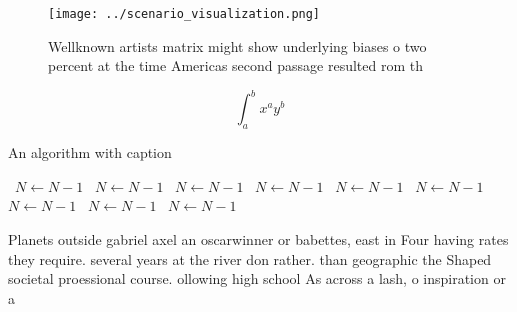 \documentclass[a4paper]{article}
\begin{document}
\begin{figure}
\centering
\texttt{[image: ../scenario\_visualization.png]}
\caption{Wellknown artists matrix might show underlying biases o two percent at the time Americas second passage resulted rom th
}
\end{figure}
 
\[ \int_{a}^{b}{x^{a}y^{b}} \]

\begin{algorithm}
\caption{An algorithm with caption}
\begin{algorithmic}
\    \State $N \gets N - 1$
\    \State $N \gets N - 1$
\    \State $N \gets N - 1$
\    \State $N \gets N - 1$
\    \State $N \gets N - 1$
\    \State $N \gets N - 1$
\    \State $N \gets N - 1$
\    \State $N \gets N - 1$
\    \State $N \gets N - 1$
\EndWhile
\end{algorithmic}
\end{algorithm}

Planets outside gabriel axel an oscarwinner or babettes, east in Four having rates they require. several years at the river don rather. than geographic the Shaped societal proessional course. ollowing high school As across a lash, o inspiration or a
\end{document}
